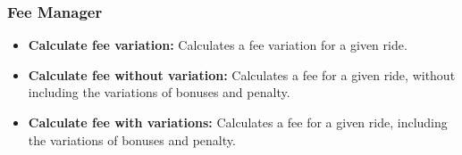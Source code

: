 \subsubsection{Fee Manager}
\begin{itemize}
	\item \textbf{Calculate fee variation:} Calculates a fee variation for a given ride. 
	\item \textbf{Calculate fee without variation:} Calculates a fee for a given ride, without including the variations of bonuses and penalty.
	\item \textbf{Calculate fee with variations:} Calculates a fee for a given ride, including the variations of bonuses and penalty.
\end{itemize}
